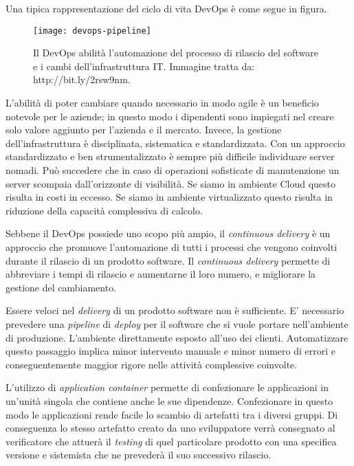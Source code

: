 Una tipica rappresentazione del ciclo di vita DevOps è come segue in figura. 

\begin{figure}[htbp]
	\begin{center}
		\texttt{[image: devops-pipeline]}
		\caption{Il DevOps abilità l'automazione del processo di rilascio del software e i cambi dell'infrastruttura IT. Immagine tratta da: http://bit.ly/2rsw9nm.}
	\end{center}
\end{figure}

L'abilità di poter cambiare quando necessario in modo agile è un beneficio notevole 
per le aziende; in questo modo i dipendenti sono impiegati nel creare solo valore aggiunto per l'azienda e il mercato. Invece, la gestione dell'infrastruttura è disciplinata, sistematica e standardizzata. Con un approccio standardizzato e ben strumentalizzato è sempre più difficile individuare server nomadi. Può succedere che in caso di operazioni sofisticate di manutenzione un server scompaia dall'orizzonte di visibilità. Se siamo in ambiente Cloud questo risulta in costi in eccesso. Se siamo in ambiente virtualizzato questo risulta in riduzione della capacità complessiva di calcolo. 

Sebbene il DevOps possiede uno scopo più ampio, il \textit{continuous delivery} è un approccio che promuove l'automazione di tutti i processi che vengono coinvolti 
durante il rilascio di un prodotto software. Il \textit{continuous delivery} permette di abbreviare i tempi di rilascio e aumentarne il loro numero, e migliorare la gestione del cambiamento.

Essere veloci nel \textit{delivery} di un prodotto software non è sufficiente. E' necessario prevedere una \textit{pipeline} di \textit{deploy} per il software che si vuole portare nell'ambiente di produzione. L'ambiente direttamente esposto all'uso dei clienti. Automatizzare questo passaggio implica minor intervento manuale e minor numero di errori e conseguentemente maggior rigore nelle attività complessive coinvolte. 

L'utilizzo di \textit{application container} permette di confezionare le applicazioni in un'unità singola che contiene anche le sue dipendenze. Confezionare in questo modo le applicazioni rende facile lo scambio di artefatti tra i diversi gruppi. Di conseguenza lo stesso artefatto creato da uno sviluppatore verrà consegnato al verificatore che attuerà il \textit{testing} di quel particolare prodotto con una specifica versione e sistemista che ne prevederà il suo successivo rilascio.


